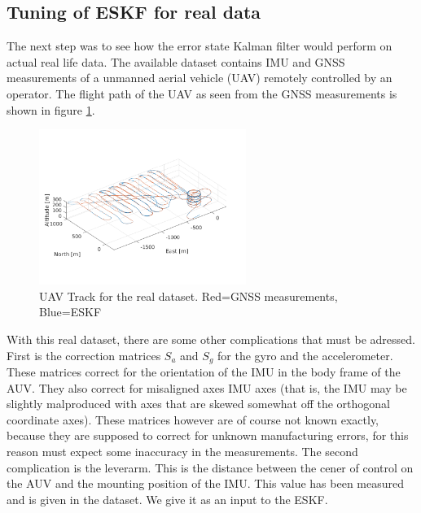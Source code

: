\subsection{Tuning of ESKF for real data} \label{a2task3}
The next step was to see how the error state Kalman filter would perform on actual real life data. The available dataset contains IMU and GNSS measurements of a unmanned aerial vehicle (UAV) remotely controlled by an operator. The flight path of the UAV as seen from the GNSS measurements is shown in figure \ref{fig:real-track}.
\begin{figure}[H]
\centering
\includegraphics[width=0.6\textwidth]{plots/a2-real-track}
\caption{UAV Track for the real dataset. Red=GNSS measurements, Blue=ESKF}
\label{fig:real-track}
\end{figure}
With this real dataset, there are some other complications that must be adressed. First is the correction matrices $S_a$ and $S_g$ for the gyro and the accelerometer. These matrices correct for the orientation of the IMU in the body frame of the AUV. They also correct for misaligned axes IMU axes (that is, the IMU may be slightly malproduced with axes that are skewed somewhat off the orthogonal coordinate axes). These matrices however are of course not known exactly, because they are supposed to correct for unknown manufacturing errors, for this reason must expect some inaccuracy in the measurements. The second complication is the leverarm. This is the distance between the cener of control on the AUV and the mounting position of the IMU. This value has been measured and is given in the dataset. We give it as an input to the ESKF.

